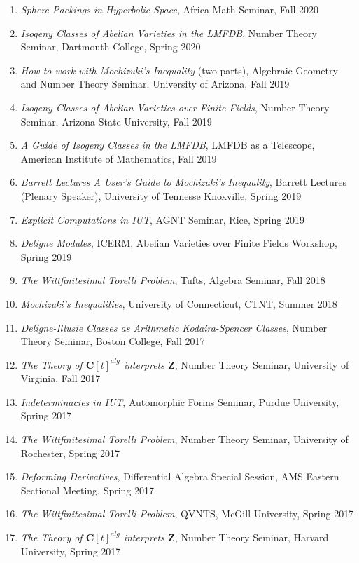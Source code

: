 \documentclass[a4paper,10pt]{article}
\newcommand{\CC}{\mathbf{C}}
\newcommand{\ZZ}{\mathbf{Z}}
\begin{document}
\begin{enumerate}
	\item \emph{Sphere Packings in Hyperbolic Space}, Africa Math Seminar, Fall 2020
	\item \emph{Isogeny Classes of Abelian Varieties in the LMFDB}, Number Theory Seminar, Dartmouth College, Spring 2020
	\item \emph{How to work with Mochizuki's Inequality} (two parts), Algebraic Geometry and Number Theory Seminar, University of Arizona, Fall 2019
	\item \emph{Isogeny Classes of Abelian Varieties over Finite Fields}, Number Theory Seminar, Arizona State University, Fall 2019
	\item \emph{A Guide of Isogeny Classes in the LMFDB}, LMFDB as a Telescope, American Institute of Mathematics, Fall 2019
	\item \emph{Barrett Lectures	A User's Guide to Mochizuki's Inequality}, Barrett Lectures (Plenary Speaker), University of Tennesse Knoxville, Spring 2019
	\item \emph{Explicit Computations in IUT}, AGNT Seminar, Rice, Spring 2019
	\item \emph{Deligne Modules}, ICERM, Abelian Varieties over Finite Fields Workshop, Spring 2019
	\item \emph{The Wittfinitesimal Torelli Problem}, Tufts, Algebra Seminar, Fall 2018
	\item \emph{Mochizuki's Inequalities}, University of Connecticut, CTNT, Summer 2018
	\item \emph{Deligne-Illusie Classes as Arithmetic Kodaira-Spencer Classes}, Number Theory Seminar, Boston College, Fall 2017
	\item \emph{The Theory of $\CC[t]^{alg}$ interprets $\ZZ$}, Number Theory Seminar, University of Virginia, Fall 2017
	\item \emph{Indeterminacies in IUT}, Automorphic Forms Seminar, Purdue University, Spring 2017
	\item \emph{The Wittfinitesimal Torelli Problem}, Number Theory Seminar, University of Rochester, Spring 2017 
	\item \emph{Deforming Derivatives}, Differential Algebra Special Session, AMS Eastern Sectional Meeting, Spring 2017
	\item \emph{The Wittfinitesimal Torelli Problem}, QVNTS, McGill University, Spring 2017 
	\item \emph{The Theory of $\CC[t]^{alg}$ interprets $\ZZ$}, Number Theory Seminar, Harvard University, Spring 2017

\end{enumerate}
\end{document}
